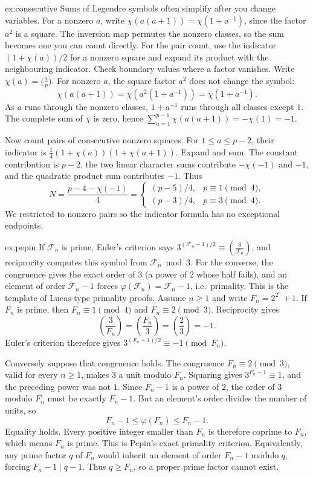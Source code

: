 \begin{solution}{ex:consecutive}
\idea Sums of Legendre symbols often simplify after you change variables. For a nonzero $a$, write $\chi(a(a+1))=\chi(1+a^{-1})$, since the factor $a^2$ is a square. The inversion map permutes the nonzero classes, so the sum becomes one you can count directly. For the pair count, use the indicator $(1+\chi(a))/2$ for a nonzero square and expand its product with the neighbouring indicator. Check boundary values where a factor vanishes.
\writeup Write $\chi(a)=\bigl(\frac ap\bigr)$. For nonzero $a$, the square factor $a^2$ does not change the symbol:
\[
\chi(a(a+1))=\chi(a^2(1+a^{-1}))=\chi(1+a^{-1}).
\]
As $a$ runs through the nonzero classes, $1+a^{-1}$ runs through all classes except $1$. The complete sum of $\chi$ is zero, hence
$\sum_{a=1}^{p-1}\chi(a(a+1))=-\chi(1)=-1$.

Now count pairs of consecutive nonzero squares. For $1\le a\le p-2$, their indicator is
$\frac14(1+\chi(a))(1+\chi(a+1))$. Expand and sum. The constant contribution is $p-2$, the two linear character sums contribute $-\chi(-1)$ and $-1$, and the quadratic product sum contributes $-1$. Thus
\[
N=\frac{p-4-\chi(-1)}4
=\begin{cases}
(p-5)/4,&p\equiv1\pmod4,\\
(p-3)/4,&p\equiv3\pmod4.
\end{cases}
\]
We restricted to nonzero pairs so the indicator formula has no exceptional endpoints.
\end{solution}

\begin{solution}{ex:pepin}
\idea If $\mathcal F_n$ is prime, Euler's criterion says $3^{(\mathcal F_n-1)/2}\equiv\left(\frac3{\mathcal F_n}\right)$, and reciprocity computes this symbol from $\mathcal F_n\bmod3$. For the converse, the congruence gives the exact order of $3$ (a power of $2$ whose half fails), and an element of order $\mathcal F_n-1$ forces $\varphi(\mathcal F_n)=\mathcal F_n-1$, i.e.\ primality. This is the template of Lucas-type primality proofs.
\writeup Assume $n\ge1$ and write $F_n=2^{2^n}+1$. If $F_n$ is prime, then $F_n\equiv1\pmod4$ and $F_n\equiv2\pmod3$. Reciprocity gives
\[
\left(\frac3{F_n}\right)=\left(\frac{F_n}3\right)=\left(\frac23\right)=-1.
\]
Euler's criterion therefore gives
$3^{(F_n-1)/2}\equiv-1\pmod{F_n}$.

Conversely suppose that congruence holds. The congruence $F_n\equiv2\pmod3$, valid for every $n\ge1$, makes $3$ a unit modulo $F_n$. Squaring gives $3^{F_n-1}\equiv1$, and the preceding power was not $1$. Since $F_n-1$ is a power of $2$, the order of $3$ modulo $F_n$ must be exactly $F_n-1$. But an element's order divides the number of units, so
\[
F_n-1\le\varphi(F_n)\le F_n-1.
\]
Equality holds. Every positive integer smaller than $F_n$ is therefore coprime to $F_n$, which means $F_n$ is prime. This is Pepin's exact primality criterion.
Equivalently, any prime factor $q$ of $F_n$ would inherit an element of order $F_n-1$ modulo $q$, forcing $F_n-1\mid q-1$. Thus $q\ge F_n$, so a proper prime factor cannot exist.
\end{solution}

